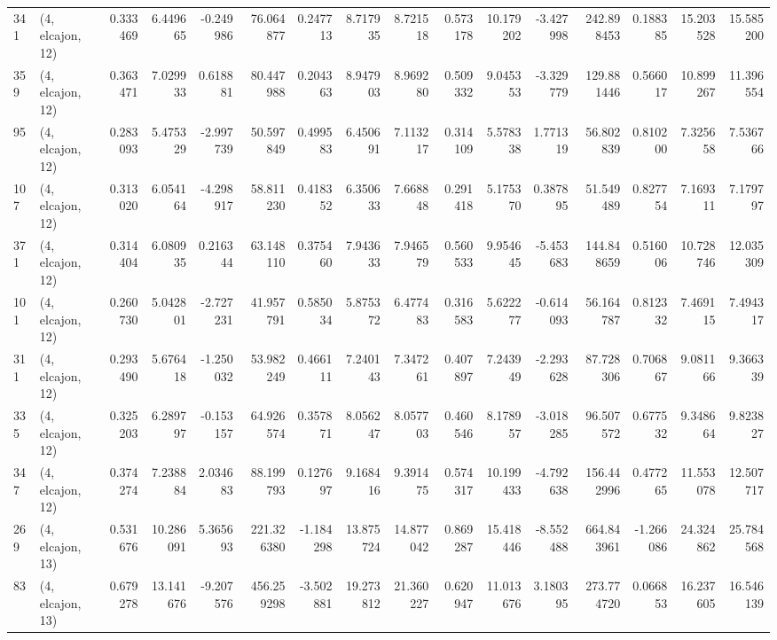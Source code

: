 \begin{tabular}{llrrrrrrrrrrrrrr}
341 &  (4, elcajon, 12) &   0.333469 &   6.449665 &  -0.249986 &    76.064877 &   0.247713 &   8.717935 &   8.721518 &  0.573178 &  10.179202 &  -3.427998 &   242.898453 &   0.188385 &  15.203528 &  15.585200 \\
359 &  (4, elcajon, 12) &   0.363471 &   7.029933 &   0.618881 &    80.447988 &   0.204363 &   8.947903 &   8.969280 &  0.509332 &   9.045353 &  -3.329779 &   129.881446 &   0.566017 &  10.899267 &  11.396554 \\
95  &  (4, elcajon, 12) &   0.283093 &   5.475329 &  -2.997739 &    50.597849 &   0.499583 &   6.450691 &   7.113217 &  0.314109 &   5.578338 &   1.771319 &    56.802839 &   0.810200 &   7.325658 &   7.536766 \\
107 &  (4, elcajon, 12) &   0.313020 &   6.054164 &  -4.298917 &    58.811230 &   0.418352 &   6.350633 &   7.668848 &  0.291418 &   5.175370 &   0.387895 &    51.549489 &   0.827754 &   7.169311 &   7.179797 \\
371 &  (4, elcajon, 12) &   0.314404 &   6.080935 &   0.216344 &    63.148110 &   0.375460 &   7.943633 &   7.946579 &  0.560533 &   9.954645 &  -5.453683 &   144.848659 &   0.516006 &  10.728746 &  12.035309 \\
101 &  (4, elcajon, 12) &   0.260730 &   5.042801 &  -2.727231 &    41.957791 &   0.585034 &   5.875372 &   6.477483 &  0.316583 &   5.622277 &  -0.614093 &    56.164787 &   0.812332 &   7.469115 &   7.494317 \\
311 &  (4, elcajon, 12) &   0.293490 &   5.676418 &  -1.250032 &    53.982249 &   0.466111 &   7.240143 &   7.347261 &  0.407897 &   7.243949 &  -2.293628 &    87.728306 &   0.706867 &   9.081166 &   9.366339 \\
335 &  (4, elcajon, 12) &   0.325203 &   6.289797 &  -0.153157 &    64.926574 &   0.357871 &   8.056247 &   8.057703 &  0.460546 &   8.178957 &  -3.018285 &    96.507572 &   0.677532 &   9.348664 &   9.823827 \\
347 &  (4, elcajon, 12) &   0.374274 &   7.238884 &   2.034683 &    88.199793 &   0.127697 &   9.168416 &   9.391475 &  0.574317 &  10.199433 &  -4.792638 &   156.442996 &   0.477265 &  11.553078 &  12.507717 \\
269 &  (4, elcajon, 13) &   0.531676 &  10.286091 &   5.365693 &   221.326380 &  -1.184298 &  13.875724 &  14.877042 &  0.869287 &  15.418446 &  -8.552488 &   664.843961 &  -1.266086 &  24.324862 &  25.784568 \\
83  &  (4, elcajon, 13) &   0.679278 &  13.141676 &  -9.207576 &   456.259298 &  -3.502881 &  19.273812 &  21.360227 &  0.620947 &  11.013676 &   3.180395 &   273.774720 &   0.066853 &  16.237605 &  16.546139 \\

\end{tabular}
